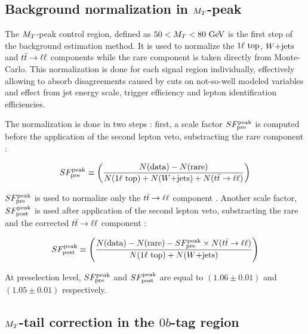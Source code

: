
        \subsection{Background normalization in $M_T$-peak \label{sec:MTpeakNormalization}}

            The $M_T$-peak control region, defined as $50 < M_T < 80 ~\text{GeV}$ is the first step of the
            background estimation method. It is used to normalize the $1\ell~\text{top}$, $\text{$W$+jets}$ and
            $t\bar{t} \rightarrow \ell \ell$ components while the rare component is taken directly from Monte-Carlo.
            This normalization is done for each signal region individually, effectively allowing to
            absorb disagreements caused by cuts on not-so-well modeled variables and effect from jet
            energy scale, trigger efficiency and lepton identification efficiencies. 

            The normalization is done in two steps : first, a scale factor $SF_{\text{pre}}^{\text{peak}}$ is
            computed before the application of the second lepton veto, substracting the rare component :

            \begin{equation}
                SF_{\text{pre}}^{\text{peak}} \equiv \left( \frac{N(\text{data}) - N(\text{rare})}{N(1\ell~\text{top}) + N(\text{$W$+jets}) + N(t\bar{t} \rightarrow \ell \ell)} \right)
                \label{eq:SFpreDefinition}
            \end{equation}

            $SF_{\text{pre}}^{\text{peak}}$ is used to normalize only the $t\bar{t} \rightarrow \ell \ell$ component . Another scale factor, $SF_{\text{post}}^{\text{peak}}$ is used after application of the second lepton veto, substracting the rare and the corrected $t\bar{t} \rightarrow \ell \ell$ component :

            \begin{equation}
                SF_{\text{post}}^{\text{peak}} \equiv \left( \frac{N(\text{data}) - N(\text{rare}) - SF_{\text{pre}}^{\text{peak}} \times N(t\bar{t} \rightarrow \ell \ell)}{N(1\ell~\text{top}) + N(\text{$W$+jets})} \right)
                \label{eq:SFpostDefinition}
            \end{equation}

            At preselection level, $SF_{\text{pre}}^{\text{peak}}$ and $SF_{\text{post}}^{\text{peak}}$ are equal to $(1.06 \pm 0.01)$ and $(1.05 \pm 0.01)$ respectively.

        \subsection{$M_T$-tail correction in the $0b$-tag region \label{sec:MTtailCorrection}}


